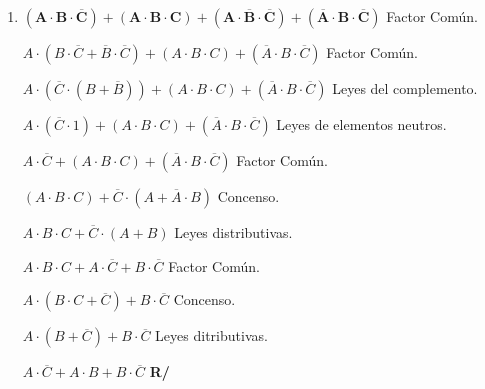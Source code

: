 \documentclass[12pt]{article}
\begin{document}
\begin{enumerate}[label = \textbf{\alph*.}]
\begin{enumerate}[label = \textbf{\arabic*.}]
                    \item $\mathbf{(A \cdot B \cdot \overline{C}) + (A \cdot B \cdot C) + (A \cdot \overline{B} \cdot \overline{C}) + (\overline{A}\cdot B \cdot \overline{C})}$ Factor Común.
                        \par$A \cdot (B \cdot \overline{C} + \overline{B} \cdot \overline{C}) + (A \cdot B \cdot C) + (\overline{A}\cdot B \cdot \overline{C})$ Factor Común.
                        \par$A \cdot (\overline{C} \cdot (B + \overline{B})) + (A \cdot B \cdot C) + (\overline{A}\cdot B \cdot \overline{C})$ Leyes del complemento.
                        \par$A \cdot (\overline{C} \cdot 1) + (A \cdot B \cdot C) + (\overline{A}\cdot B \cdot \overline{C})$ Leyes de elementos neutros.
                        \par$A \cdot \overline{C} + (A \cdot B \cdot C) + (\overline{A}\cdot B \cdot \overline{C})$ Factor Común.
                        \par$(A \cdot B \cdot C) +  \overline{C} \cdot (A + \overline{A} \cdot B)$ Concenso.
                        \par$A \cdot B \cdot C + \overline{C} \cdot (A + B)$ Leyes distributivas.
                        \par$A \cdot B \cdot C + A \cdot \overline{C} + B \cdot \overline{C}$ Factor Común.
                        \par$A \cdot (B \cdot C + \overline{C}) + B \cdot \overline{C}$ Concenso.
                        \par$A \cdot (B + \overline{C}) + B \cdot \overline{C}$ Leyes ditributivas.
                        \par$A \cdot \overline{C} + A \cdot B + B \cdot \overline{C}$ \textbf{R/}
                        \vspace{0.5cm}
                    

\end{enumerate}
\end{enumerate}
\end{document}
